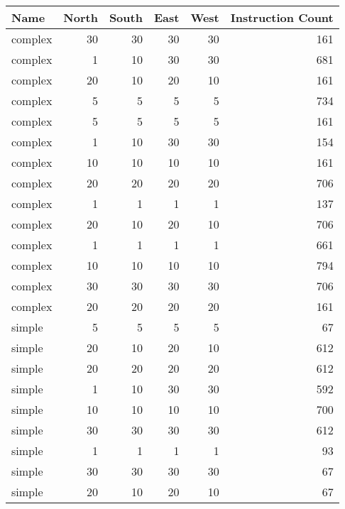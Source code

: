 \begin{tabular}{lrrrrr}
\toprule
      Name &  North &  South &  East &  West &  Instruction Count \\
\midrule
   complex &     30 &     30 &    30 &    30 &                161 \\
   complex &      1 &     10 &    30 &    30 &                681 \\
   complex &     20 &     10 &    20 &    10 &                161 \\
   complex &      5 &      5 &     5 &     5 &                734 \\
   complex &      5 &      5 &     5 &     5 &                161 \\
   complex &      1 &     10 &    30 &    30 &                154 \\
   complex &     10 &     10 &    10 &    10 &                161 \\
   complex &     20 &     20 &    20 &    20 &                706 \\
   complex &      1 &      1 &     1 &     1 &                137 \\
   complex &     20 &     10 &    20 &    10 &                706 \\
   complex &      1 &      1 &     1 &     1 &                661 \\
   complex &     10 &     10 &    10 &    10 &                794 \\
   complex &     30 &     30 &    30 &    30 &                706 \\
   complex &     20 &     20 &    20 &    20 &                161 \\
    simple &      5 &      5 &     5 &     5 &                 67 \\
    simple &     20 &     10 &    20 &    10 &                612 \\
    simple &     20 &     20 &    20 &    20 &                612 \\
    simple &      1 &     10 &    30 &    30 &                592 \\
    simple &     10 &     10 &    10 &    10 &                700 \\
    simple &     30 &     30 &    30 &    30 &                612 \\
    simple &      1 &      1 &     1 &     1 &                 93 \\
    simple &     30 &     30 &    30 &    30 &                 67 \\
    simple &     20 &     10 &    20 &    10 &                 67 \\

\end{tabular}
